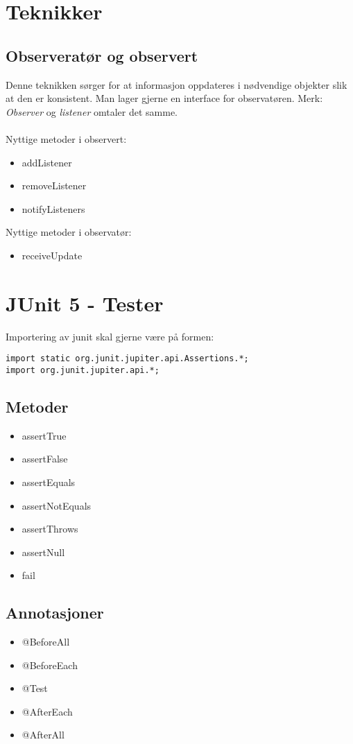 \documentclass{article}
\begin{document}
\section{Teknikker}

\subsection{Observeratør og observert}
Denne teknikken sørger for at informasjon oppdateres i nødvendige objekter slik at den er konsistent. Man lager gjerne en interface for observatøren. Merk: \textit{Observer} og \textit{listener} omtaler det samme.\\\\
Nyttige metoder i observert:
\begin{itemize}
    \item addListener
    \item removeListener
    \item notifyListeners
\end{itemize}
Nyttige metoder i observatør:
\begin{itemize}
    \item receiveUpdate
\end{itemize}


\section{JUnit 5 - Tester}
Importering av junit skal gjerne være på formen:
\begin{verbatim}
import static org.junit.jupiter.api.Assertions.*;
import org.junit.jupiter.api.*;
\end{verbatim}

\subsection{Metoder}
\begin{itemize}
    \item assertTrue
    \item assertFalse
    \item assertEquals
    \item assertNotEquals
    \item assertThrows
    \item assertNull
    \item fail
\end{itemize}

\subsection{Annotasjoner}
\begin{itemize}
    \item @BeforeAll
    \item @BeforeEach
    \item @Test
    \item @AfterEach
    \item @AfterAll
\end{itemize}
\end{document}
